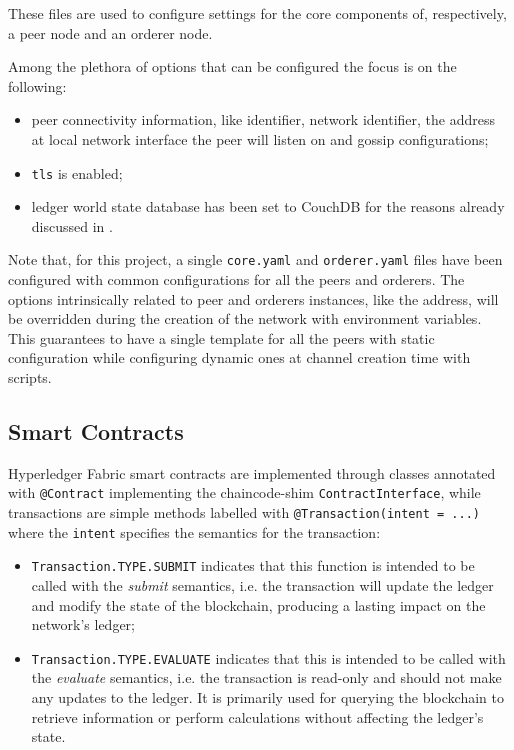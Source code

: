 \documentclass{scrartcl}
\begin{document}
These files are used to configure settings for the core components of, respectively, a peer node and an orderer node. 

Among the plethora of options that can be configured the focus is on the following:
\begin{itemize}
    \item peer connectivity information, like identifier, network identifier, the address at local network interface the peer will listen on and gossip configurations;
    \item \texttt{tls} is enabled;
    \item ledger world state database has been set to CouchDB for the reasons already discussed in .
\end{itemize}

Note that, for this project, a single \texttt{core.yaml} and \texttt{orderer.yaml} files have been configured with common configurations for all the peers and orderers.
%
The options intrinsically related to peer and orderers instances, like the address, will be overridden during the creation of the network with environment variables.
%
This guarantees to have a single template for all the peers with static configuration while configuring dynamic ones at channel creation time with scripts.

\subsection{Smart Contracts}

Hyperledger Fabric smart contracts are implemented through classes annotated with \texttt{@Contract} implementing the chaincode-shim \texttt{ContractInterface}, while transactions are simple methods labelled with \texttt{@Transaction(intent = ...)} where the \texttt{intent} specifies the semantics for the transaction:
\begin{itemize}
    \item \texttt{Transaction.TYPE.SUBMIT} indicates that this function is intended to be called with the \textit{submit} semantics, i.e. the transaction will update the ledger and modify the state of the blockchain, producing a lasting impact on the network's ledger;
    \item \texttt{Transaction.TYPE.EVALUATE} indicates that this is intended to be called with the \textit{evaluate} semantics, i.e. the transaction is read-only and should not make any updates to the ledger. It is primarily used for querying the blockchain to retrieve information or perform calculations without affecting the ledger's state.
\end{itemize}
\end{document}
